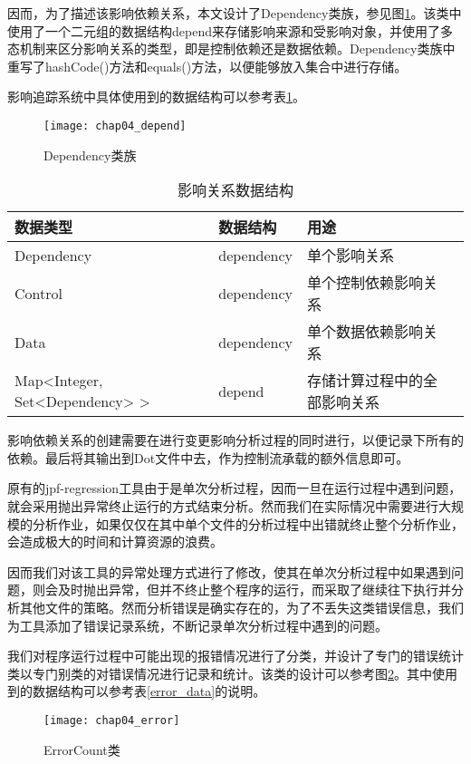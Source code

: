 因而，为了描述该影响依赖关系，本文设计了Dependency类族，参见图\ref {class_depend}。该类中使用了一个二元组的数据结构depend来存储影响来源和受影响对象，并使用了多态机制来区分影响关系的类型，即是控制依赖还是数据依赖。Dependency类族中重写了hashCode()方法和equals()方法，以便能够放入集合中进行存储。

影响追踪系统中具体使用到的数据结构可以参考表\ref {track_data}。

\begin{figure}[H]
	\centering
	\texttt{[image: chap04\_depend]}
	\caption {Dependency类族}
	\label {class_depend}	
\end{figure}

\begin{table}
	\caption{影响关系数据结构}
	\label{track_data}
	\centering
	\begin{tabular}{lllc}
		\toprule[1.5pt]
		{\heiti 数据类型} &{\heiti 数据结构} & {\heiti 用途} \\\midrule[1pt]
		Dependency & dependency & 单个影响关系 \\
		Control & dependency & 单个控制依赖影响关系 \\
		Data & dependency & 单个数据依赖影响关系 \\
		Map<Integer, Set<Dependency> > & depend & 存储计算过程中的全部影响关系\\
		\bottomrule[1.5pt]
	\end{tabular}
\end{table}

影响依赖关系的创建需要在进行变更影响分析过程的同时进行，以便记录下所有的依赖。最后将其输出到Dot文件中去，作为控制流承载的额外信息即可。

原有的jpf-regression工具由于是单次分析过程，因而一旦在运行过程中遇到问题，就会采用抛出异常终止运行的方式结束分析。然而我们在实际情况中需要进行大规模的分析作业，如果仅仅在其中单个文件的分析过程中出错就终止整个分析作业，会造成极大的时间和计算资源的浪费。

因而我们对该工具的异常处理方式进行了修改，使其在单次分析过程中如果遇到问题，则会及时抛出异常，但并不终止整个程序的运行，而采取了继续往下执行并分析其他文件的策略。然而分析错误是确实存在的，为了不丢失这类错误信息，我们为工具添加了错误记录系统，不断记录单次分析过程中遇到的问题。

我们对程序运行过程中可能出现的报错情况进行了分类，并设计了专门的错误统计类以专门别类的对错误情况进行记录和统计。该类的设计可以参考图\ref {class_error}。其中使用到的数据结构可以参考表\ref {error_data}的说明。

\begin{figure}[H]
	\centering
	\texttt{[image: chap04\_error]}
	\caption {ErrorCount类}
	\label {class_error}	
\end{figure}

